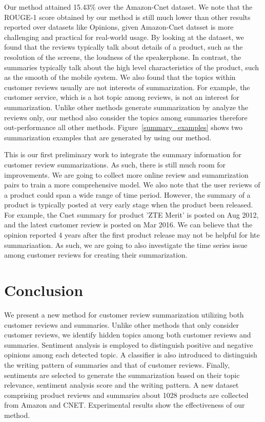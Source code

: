 \documentclass[letterpaper]{article}
\begin{document}
Our method attained 15.43\% over the Amazon-Cnet dataset.
We note that the ROUGE-1 score obtained by our method is still much lower than other results reported over datasets like Opinions, given Amazon-Cnet datsset is more challenging and practical for real-world usage. 
By looking at the dataset, we found that the reviews typically talk about details of a product, such as the resolution of the screens, the loudness of the speakerphone. 
In contrast, the summaries typically talk about the high level characteristics of the product, such as the smooth of the mobile system.  
We also found that the topics within customer reviews usually are not interests of summarization. For example, the customer service, which is a hot topic among reviews, is not an interest for summarization.
Unlike other methods generate summarization by analyze the reviews only, our method also consider the topics among summaries therefore out-performance all other methods.
Figure~\ref{summary_examples} shows two summarization examples that are generated by using our method. 

This is our first preliminary work to integrate the summary information for customer review summarizations. As such, there is still much room for improvements. We are going to collect more online review and sumamrization pairs to train a more comprehensive model. 
We also note that the user reviews of a product could span a wide range of time period. However, the summary of a product is typically posted at very early stage when the product been released. For example, the Cnet summary for product 'ZTE Merit' is posted on Aug 2012, and the latest customer review is posted on Mar 2016. We can believe that the opinion reported 4 years after the first product release may not be helpful for hte summariaation.
As such, we are going to also investigate the time series issue among customer reviews for creating their summarization.


\section{Conclusion}
 
We present a new method for customer review summarization utilizing both customer reviews and summaries. Unlike other methods that only consider customer reviews, we identify hidden topics among both customer reviews and summaries. 
Sentiment analysis is employed to distinguish positive and negative opinions among each detected topic. 
A classifier is also introduced to distinguish the writing pattern of summaries and that of customer reviews. 
Finally, sentiments are selected to generate the summarization based on their topic relevance, sentiment analysis score and the writing pattern. A new dataset comprising product reviews and summaries about 1028 products are collected from Amazon and CNET. Experimental results show the effectiveness of our method. %
\end{document}
